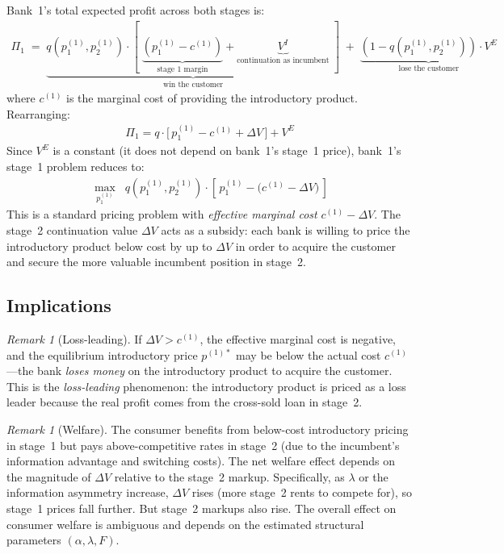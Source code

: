 \documentclass[12pt]{article}
\theoremstyle{plain}
\theoremstyle{plain}
\theoremstyle{definition}  %
\theoremstyle{remark}  %
\newtheorem{remark}[thm]{Remark}  %
\begin{document}
\medskip\noindent
Bank~1's total expected profit across both stages is:
\begin{align}\label{eq:total_profit}
    \Pi_1 \;=\; \underbrace{q\!\left(p_1^{(1)}, p_2^{(1)}\right) \cdot \left[\;\underbrace{\left(p_1^{(1)} - c^{(1)}\right)}_{\text{stage~1 margin}} + \underbrace{V^I}_{\text{continuation as incumbent}}\;\right]}_{\text{win the customer}} \;+\; \underbrace{\left(1 - q\!\left(p_1^{(1)}, p_2^{(1)}\right)\right) \cdot V^E}_{\text{lose the customer}}
\end{align}
where $c^{(1)}$ is the marginal cost of providing the introductory product. Rearranging:
\begin{align}\label{eq:total_profit2}
    \Pi_1 = q \cdot \big[\,p_1^{(1)} - c^{(1)} + \Delta V\,\big] + V^E
\end{align}
Since $V^E$ is a constant (it does not depend on bank~1's stage~1 price), bank~1's stage~1 problem reduces to:
\begin{align}\label{eq:stage1_max}
    \boxed{\;\max_{p_1^{(1)}} \;\; q\!\left(p_1^{(1)}, p_2^{(1)}\right) \cdot \left[\,p_1^{(1)} - \big(c^{(1)} - \Delta V\big)\,\right]\;}
\end{align}
This is a standard pricing problem with \emph{effective marginal cost} $c^{(1)} - \Delta V$. The stage~2 continuation value $\Delta V$ acts as a subsidy: each bank is willing to price the introductory product below cost by up to $\Delta V$ in order to acquire the customer and secure the more valuable incumbent position in stage~2.

\subsection{Implications}

\begin{remark}[Loss-leading]
If $\Delta V > c^{(1)}$, the effective marginal cost is negative, and the equilibrium introductory price $p^{(1)*}$ may be below the actual cost $c^{(1)}$---the bank \emph{loses money} on the introductory product to acquire the customer. This is the \emph{loss-leading} phenomenon: the introductory product is priced as a loss leader because the real profit comes from the cross-sold loan in stage~2.
\end{remark}

\begin{remark}[Welfare]
The consumer benefits from below-cost introductory pricing in stage~1 but pays above-competitive rates in stage~2 (due to the incumbent's information advantage and switching costs). The net welfare effect depends on the magnitude of $\Delta V$ relative to the stage~2 markup. Specifically, as $\lambda$ or the information asymmetry increase, $\Delta V$ rises (more stage~2 rents to compete for), so stage~1 prices fall further. But stage~2 markups also rise. The overall effect on consumer welfare is ambiguous and depends on the estimated structural parameters $(\alpha, \lambda, F)$.
\end{remark}
\end{document}
